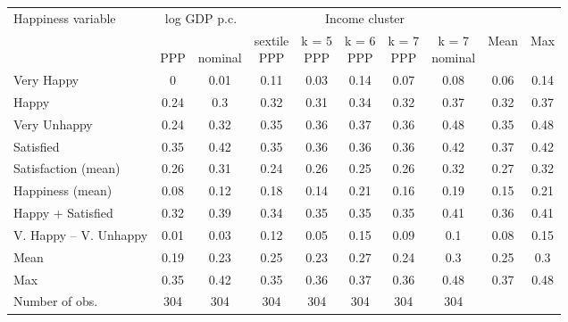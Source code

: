 
\begin{tabular}[t]{lccccccccc}
\toprule Happiness variable & \multicolumn{2}{c}{log GDP p.c.} & \multicolumn{5}{c}{Income cluster} & & \\
  & \makecell{\,\\PPP} & \makecell{\,\\nominal} & \makecell{sextile\\PPP} & \makecell{k = 5\\PPP} & \makecell{k = 6\\PPP} & \makecell{k = 7\\PPP} & \makecell{k = 7\\nominal} & Mean & Max\\
\midrule
Very Happy & 0 & 0.01 & 0.11 & 0.03 & 0.14 & 0.07 & 0.08 & 0.06 & 0.14\\
Happy & 0.24 & 0.3 & 0.32 & 0.31 & 0.34 & 0.32 & 0.37 & 0.32 & 0.37\\
Very Unhappy & 0.24 & 0.32 & 0.35 & 0.36 & 0.37 & 0.36 & 0.48 & 0.35 & 0.48\\
Satisfied & 0.35 & 0.42 & 0.35 & 0.36 & 0.36 & 0.36 & 0.42 & 0.37 & 0.42\\
Satisfaction (mean) & 0.26 & 0.31 & 0.24 & 0.26 & 0.25 & 0.26 & 0.32 & 0.27 & 0.32\\
Happiness (mean) & 0.08 & 0.12 & 0.18 & 0.14 & 0.21 & 0.16 & 0.19 & 0.15 & 0.21\\
Happy + Satisfied & 0.32 & 0.39 & 0.34 & 0.35 & 0.35 & 0.35 & 0.41 & 0.36 & 0.41\\
V. Happy -- V. Unhappy & 0.01 & 0.03 & 0.12 & 0.05 & 0.15 & 0.09 & 0.1 & 0.08 & 0.15\\ \midrule 
Mean & 0.19 & 0.23 & 0.25 & 0.23 & 0.27 & 0.24 & 0.3 & 0.25 & 0.3\\
Max & 0.35 & 0.42 & 0.35 & 0.36 & 0.37 & 0.36 & 0.48 & 0.37 & 0.48\\ \midrule 
Number of obs. & 304 & 304 & 304 & 304 & 304 & 304 & 304 &  & \\
\bottomrule
\end{tabular}